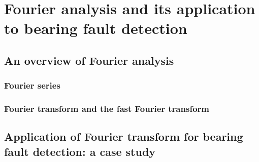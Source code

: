 \documentclass[../Main/thesis.tex]{subfiles}
\begin{document}
\chapter[Fourier analysis and its application to bearing fault detection]{Fourier analysis and its application to bearing fault detection}
\label{sec:chapter2}

\section{An overview of Fourier analysis}
\subsection{Fourier series}
\subsection{Fourier transform and the fast Fourier transform}
\section{Application of Fourier transform for bearing fault detection: a case study}

\blankpage
\end{document}

